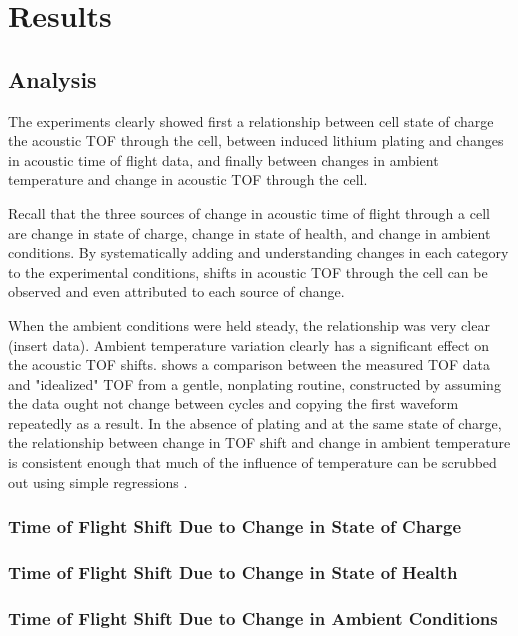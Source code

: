 \chapter{Results}
\section{Analysis}

The experiments clearly showed first a relationship between cell state of charge the acoustic TOF through the cell, between induced lithium plating and changes in acoustic time of flight data, and finally between changes in ambient temperature and change in acoustic TOF through the cell. 

Recall that the three sources of change in acoustic time of flight through a cell are change in state of charge, change in state of health, and change in ambient conditions. 
By systematically adding and understanding changes in each category to the experimental conditions, shifts in acoustic TOF through the cell can be observed and even attributed to each source of change.

When the ambient conditions were held steady, the relationship was very clear (insert data). Ambient temperature variation clearly has a significant effect on the acoustic TOF shifts.  shows a comparison between the measured TOF data and "idealized" TOF from a gentle, nonplating routine, constructed by assuming the data ought not change between cycles and copying the first waveform repeatedly as a result. In the absence of plating and at the same state of charge, the relationship between change in TOF shift and change in ambient temperature is consistent enough that much of the influence of temperature can be scrubbed out using simple regressions .

\subsection{Time of Flight Shift Due to Change in State of Charge}

\subsection{Time of Flight Shift Due to Change in State of Health}

\subsection{Time of Flight Shift Due to Change in Ambient Conditions}